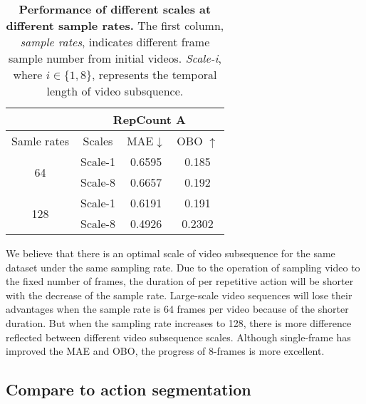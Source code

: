 \documentclass[10pt,twocolumn,letterpaper]{article}
\begin{document}
\begin{table}[ht]
	\begin{center}
		\begin{tabular}{c|ccc}
			\hline
			                     & \multicolumn{3}{c}{RepCount A}                                                         \\ \hline
			Samle rates          & \multicolumn{1}{c|}{Scales}    & \multicolumn{1}{c|}{MAE$\downarrow$} & OBO $\uparrow$ \\ \hline
			\multirow{2}{*}{64}  & \multicolumn{1}{c|}{Scale-1}   & \multicolumn{1}{c|}{0.6595}          & 0.185          \\
			                     & \multicolumn{1}{c|}{Scale-8}   & \multicolumn{1}{c|}{0.6657}          & 0.192          \\ \hline
			\multirow{2}{*}{128} & \multicolumn{1}{c|}{Scale-1}   & \multicolumn{1}{c|}{0.6191}          & 0.191          \\
			                     & \multicolumn{1}{c|}{Scale-8}   & \multicolumn{1}{c|}{0.4926}          & 0.2302         \\ \hline
		\end{tabular}
		\caption{
			\textbf{Performance of different scales at different sample rates.} The first column, \emph{sample rates}, indicates different frame sample number from initial videos. \emph{Scale-i}, where $i\in\{1,8\}$, represents the temporal length of video subsquence.
		}
		\label{tab:8+128}
	\end{center}
\end{table}

We believe that there is an optimal scale of video subsequence for the same dataset under the same sampling rate. Due to the operation of sampling video to the fixed number of frames, the duration of per repetitive action will be shorter with the decrease of the sample rate. Large-scale video sequences will lose their advantages when the sample rate is 64 frames per video because of the shorter duration. But when the sampling rate increases to 128, there is more difference reflected between different video subsequence scales.  Although single-frame has improved the MAE and OBO, the progress of 8-frames is more excellent.




\subsection{Compare to action segmentation}
\end{document}
